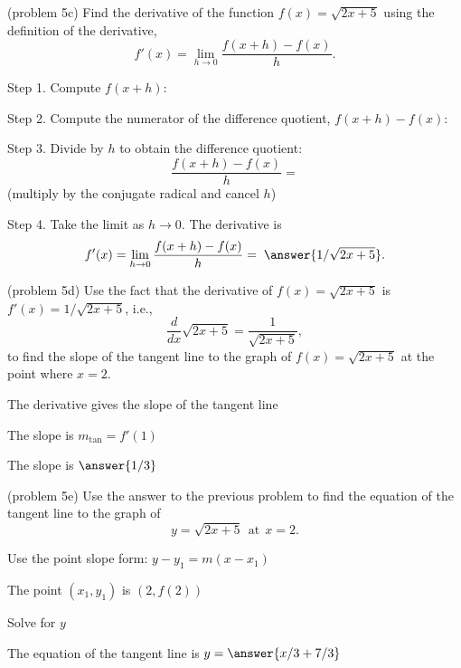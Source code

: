\documentclass{ximera}
\begin{document}
\begin{problem}(problem 5c)
Find the derivative of the function $f(x) = \sqrt{2x + 5}$ using the definition of the derivative,
\[
f'(x) = \lim_{h \to 0} \frac{f(x+h) - f(x)}{h}.
\]

Step 1. Compute $f(x + h)$:
\begin{multipleChoice}
\end{multipleChoice}


Step 2. Compute the numerator of the difference quotient, $f(x+h) - f(x)$:
\begin{multipleChoice}
\end{multipleChoice}


Step 3. Divide by $h$ to obtain the difference quotient:
\[
\frac{f(x+h) - f(x)}{h} = 
\]
(multiply by the conjugate radical and cancel $h$)
\begin{multipleChoice}
\end{multipleChoice}

Step 4. Take the limit as $h \to 0$. The derivative is
\[
f'(x) = \lim_{h \to 0} \frac{f(x+h) - f(x)}{h} = \; \answer{1/\sqrt{2x+5}}.
\]
\end{problem} 


\begin{problem}(problem 5d)
Use the fact that the derivative of $f(x) = \sqrt{2x + 5}$ is $f'(x) = 1/\sqrt{2x+5}$,
i.e., 
\[
\frac{d}{dx}\sqrt{2x+5} = \frac{1}{\sqrt{2x+5}},
\]
to find the slope of the tangent line to the graph of 
$f(x) = \sqrt{2x+5}$ at the point where $x = 2$.\\
\begin{hint}
The derivative gives the slope of the tangent line
\end{hint}
\begin{hint}
The slope is $m_{\text{tan}} = f'(1)$
\end{hint}
The slope is $\answer{1/3}$
\end{problem}

\begin{problem}(problem 5e)
Use the answer to the previous problem to find the equation of the tangent line to the graph of 
\[
y = \sqrt{2x+5} \ \ \text{at} \ \ x=2.
\]
\begin{hint}
Use the point slope form: $y-y_1 = m(x-x_1)$
\end{hint}
\begin{hint}
The point $(x_1,y_1)$ is $(2, f(2))$
\end{hint}
\begin{hint}
Solve for $y$
\end{hint}
The equation of the tangent line is \; $y = \answer{x/3 + 7/3}$
\end{problem}
\end{document}
